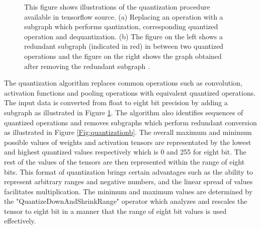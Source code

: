 \begin{figure}
\begin{subfigure}{.6\textwidth}
			\caption{}
			\label{Fig:quantizationa}
		\end{subfigure}
		\caption{ This figure shows illustrations of the quantization procedure available in tensorflow source. (a) Replacing an operation with a subgraph which performs qantization, corresponding quantized operation and dequantization. (b) The figure on the left shows a redundant subgraph (indicated in red) in between two quantized operations and the figure on the right shows the graph obtained after removing the redundant subgraph \cite{quant_blog}.}
		\label{Fig:quantization}
	\end{figure}

The quantization algorithm replaces common operations such as convolution, activation functions and pooling operations with equivalent quantized operations. The input data is converted from float to eight bit precision by adding a subgraph as illustrated in Figure \ref{Fig:quantizationa}. The algorithm also identifies sequences of quantized operations and removes subgraphs which perform redundant conversion as illustrated in Figure \ref{Fig:quantizationb}. The overall maximum and minimum possible values of weights and activation tensors are representated by the lowest and highest quantized values respectively which is 0 and 255 for eight bit. The rest of the values of the tensors are then represented within the range of eight bits. This format of quantization brings certain advantages such as the ability to represent arbitrary ranges and negative numbers, and the linear spread of values facilitates multiplication. The minimum and maximum values are determined by the "QuantizeDownAndShrinkRange" operator which analyzes and rescales the tensor to eight bit in a manner that the range of eight bit values is used effectively.